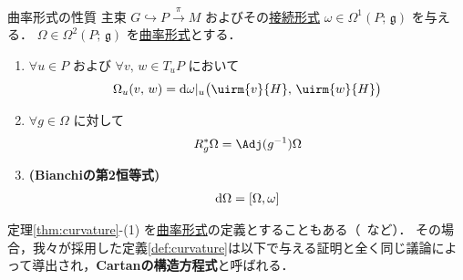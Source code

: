 \documentclass[TQFT_main]{subfiles}
\begin{document}
\begin{mytheo}[label=thm:curvature]{曲率形式の性質}
    主束 $G \hookrightarrow P \xrightarrow{\pi} M$ およびその\hyperref[def:connection]{接続形式} $\omega \in \Omega^1(P;\, \mathfrak{g})$ を与える．
    $\Omega \in \Omega^2 (P;\, \mathfrak{g})$ を\hyperref[def:curvature]{曲率形式}とする．

    \begin{enumerate}
        \item $\forall u \in P$ および $\forall v,\, w \in T_u P$ において
        \begin{align}
            \Omega_u (v,\, w) = \dd \omega|_u \bigl( \uirm{v}{H},\, \uirm{w}{H} \bigr) 
        \end{align}
        \item $\forall g \in \Omega$ に対して
        \begin{align}
            R_g^* \Omega = \Adj (g^{-1}) \Omega
        \end{align}
        
        \item \textbf{(Bianchiの第2恒等式)}
        \begin{align}
            \dd{\Omega} = \comm{\Omega}{\omega}
        \end{align}
    \end{enumerate}
    
\end{mytheo}

\begin{marker}
    定理\ref{thm:curvature}-(1) を\hyperref[def:curvature]{曲率形式}の定義とすることもある（~\cite[p.43]{Nakahara2018topo2}など）．
    その場合，我々が採用した定義\ref{def:curvature}は以下で与える証明と全く同じ議論によって導出され，\textbf{Cartanの構造方程式}と呼ばれる．
\end{marker}
\end{document}
